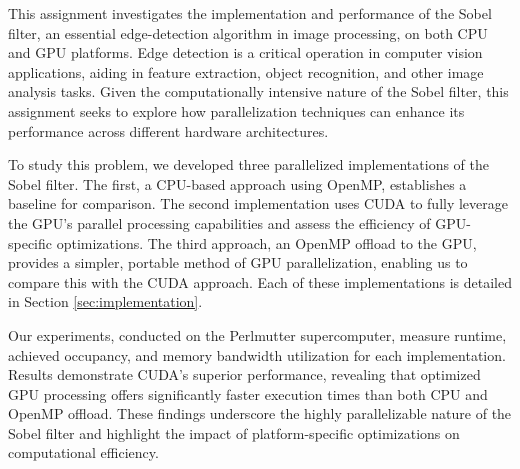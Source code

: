 




This assignment investigates the implementation and performance of the Sobel filter, an essential edge-detection algorithm in image processing, on both CPU and GPU platforms. Edge detection is a critical operation in computer vision applications, aiding in feature extraction, object recognition, and other image analysis tasks. Given the computationally intensive nature of the Sobel filter, this assignment seeks to explore how parallelization techniques can enhance its performance across different hardware architectures.

To study this problem, we developed three parallelized implementations of the Sobel filter. The first, a CPU-based approach using OpenMP, establishes a baseline for comparison. The second implementation uses CUDA to fully leverage the GPU's parallel processing capabilities and assess the efficiency of GPU-specific optimizations. The third approach, an OpenMP offload to the GPU, provides a simpler, portable method of GPU parallelization, enabling us to compare this with the CUDA approach. Each of these implementations is detailed in Section \ref{sec:implementation}.

Our experiments, conducted on the Perlmutter supercomputer, measure runtime, achieved occupancy, and memory bandwidth utilization for each implementation. Results demonstrate CUDA’s superior performance, revealing that optimized GPU processing offers significantly faster execution times than both CPU and OpenMP offload. These findings underscore the highly parallelizable nature of the Sobel filter and highlight the impact of platform-specific optimizations on computational efficiency.